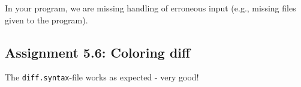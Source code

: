 \documentclass[a4paper]{article}
\begin{document}
In your program, we are missing handling of erroneous input (e.g., missing files given to the program).

\subsection*{Assignment 5.6:  Coloring diff}

The \texttt{diff.syntax}-file works as expected - very good!



\end{document}
